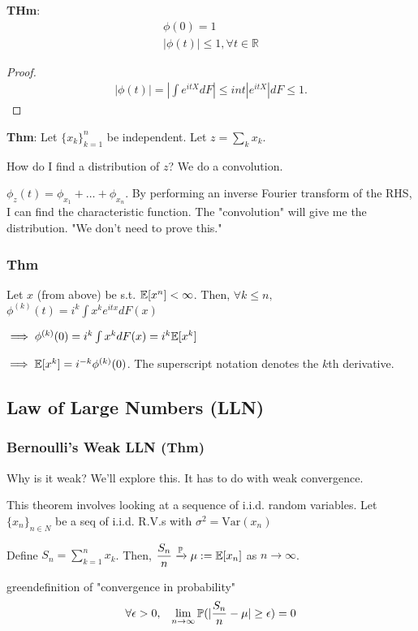 \textbf{THm}:
\begin{gather}
\phi(0) = 1 \\
|\phi(t)| \leq 1, \forall t\in \mathbb{R}
\end{gather}
\begin{proof}
\[\begin{aligned}
|\phi(t)| = |\int e^{itX} dF| \leq int |e^{itX}| dF \leq 1.
\end{aligned}\]
\end{proof}


\textbf{Thm}: Let $\{ x_k\}_{k=1}^n$ be independent. Let $z = \sum_k x_k$.

How do I find a distribution of $z$? We do a convolution.

$\phi_z(t) = \phi_{x_1} + \ldots + \phi_{x_n}$.  By performing an inverse Fourier transform of the RHS, I can find the characteristic function. The "convolution" will give me the distribution. "We don't need to prove this."


\subsubsection*{Thm} Let $x$ (from above) be s.t. $\mathbb{E}[x^n] < \infty$. Then, $\forall k\leq n,$ $\phi^{(k)}(t) = i^k \int x^k e^{itx} dF(x)$

$\implies \phi^{(k)}(0) = i^k \int x^k dF(x)  = i^k \mathbb{E}[x^k]$

$\implies \mathbb{E}[x^k] = i^{-k} \phi^{(k)}(0)$. The superscript notation denotes the $k$th derivative.


\subsection{Law of Large Numbers (LLN)}

\subsubsection*{Bernoulli's Weak LLN (Thm)}

Why is it weak? We'll explore this. It has to do with weak convergence.

This theorem involves looking at a sequence of i.i.d. random variables.  Let $\{ x_n\}_{n\in N}$ be  a seq of i.i.d. R.V.s with $\sigma^2 = \text{Var}(x_n)$

Define $S_n = \sum_{k=1}^n x_k$. Then, $\dfrac{S_n}{n} \xrightarrow[]{\mathbb{P}} \mu := \mathbb{E}[x_n]$ as $n\to\infty$.

\begin{mybox}{green}{definition of "convergence in probability"}
\[\forall \epsilon > 0 , \;\;\; \lim\limits_{n\to\infty} \mathbb{P}(|\frac{S_n}{n} - \mu| \geq \epsilon) = 0 \]
\end{mybox}

